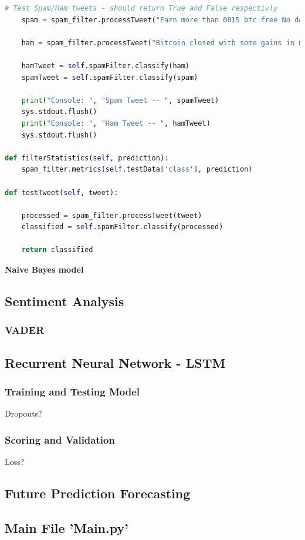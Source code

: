 \documentclass[oneside, 12pt]{article}
\begin{document}
\begin{lstlisting}[language=python, caption=Spam filter training Class]
	# Test Spam/Ham tweets - should return True and False respectivly
	spam = spam_filter.processTweet("Earn more than 0015 btc free No deposit No investment Free Bitcoins - Earn $65 free btc in 5 minutes bitcoin freebtc getbtc")
				
	ham = spam_filter.processTweet("Bitcoin closed with some gains in month of February")
				
	hamTweet = self.spamFilter.classify(ham)
	spamTweet = self.spamFilter.classify(spam)
				
	print("Console: ", "Spam Tweet -- ", spamTweet)
	sys.stdout.flush()
	print("Console: ", "Ham Tweet -- ", hamTweet)
	sys.stdout.flush()
				
def filterStatistics(self, prediction):
	spam_filter.metrics(self.testData['class'], prediction)
				
def testTweet(self, tweet):
				
	processed = spam_filter.processTweet(tweet)
	classified = self.spamFilter.classify(processed)
				
	return classified
				\end{lstlisting}
				
				\textbf{Naive Bayes model}
		
		\subsection{Sentiment Analysis}
			\subsubsection{VADER}
			
		\subsection{Recurrent Neural Network - LSTM}
			\subsubsection{Training and Testing Model}
			Dropouts?
			\subsubsection{Scoring and Validation}
			Loss?
		\subsection{Future Prediction Forecasting}
		
		
		\subsection{Main File 'Main.py'}
		
\end{document}
